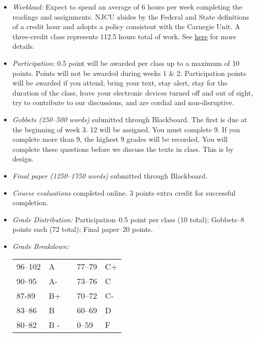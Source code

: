 \documentclass[article,oneside]{memoir}
\begin{document}
\begin{itemize}
\item \textit{Workload:} Expect to spend an average of 6 hours per week completing the readings and assignments. NJCU abides by the Federal and State definitions of a credit hour and adopts a policy consistent with the Carnegie Unit. A three-credit class represents 112.5 hours total of work. See \href{http://scottoconnor.org/resources/Credit.pdf}{here} for more details.

\item \textit{Participation:} 0.5 point will be awarded per class up to a maximum of 10 points. Points will not be awarded during weeks 1 \& 2. Participation points will be awarded if you attend, bring your text, stay alert, stay for the duration of the class, leave your electronic devices turned off and out of sight, try to contribute to our discussions, and are cordial and non-disruptive. 


\item \textit{Gobbets (250--500 words)} submitted through Blackboard. The first is due at the beginning of week 3. 12 will be assigned. You must complete 9. If you complete more than 9, the highest 9 grades will be recorded. You will complete these questions before we discuss the texts in class. This is by design. 



\item \textit{Final paper  (1250--1750 words) } submitted through Blackboard. 

\item \textit{Course evaluations} completed online. 3 points extra credit for successful completion.

\item \textit{Grade Distribution:} Participation--0.5 point per class (10 total); Gobbets--8 points each (72 total); Final paper--20 points. 

\item \textit{Grade Breakdown:}

 \begin{tabular}{ | l | l | p{2cm} | l | l | }
    \hline 
96--102 & A  & &  77--79 &  C+ \\  
90--95 & A- & &  73--76 & C \\
87-89 & B+ &  &  70--72 & C- \\ 
83--86 & B  & &  60--69 & D\\
80--82 & B - & & 0--59 & F\\ \hline
    \end{tabular}


\end{itemize}
\end{document}
